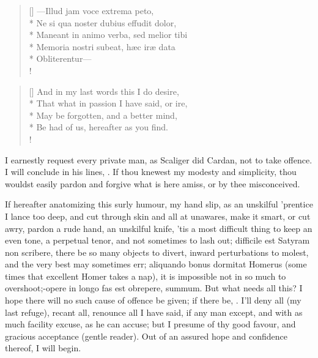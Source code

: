 {\settowidth{\versewidth}{Maneant in animo verba, sed melior tibi}
\begin{verse}[\versewidth]
---Illud jam voce extrema peto,\\*
Ne si qua noster dubius effudit dolor,\\*
Maneant in animo verba, sed melior tibi\\*
Memoria nostri subeat, h\ae{}c ir\ae{} data\\*
Obliterentur---\\!
\end{verse}

\settowidth{\versewidth}{That what in passion I have said, or ire,}
\begin{verse}[\versewidth]
And in my last words this I do desire,\\*
That what in passion I have said, or ire,\\*
May be forgotten, and a better mind,\\*
Be had of us, hereafter as you find.\\!
\end{verse}

I earnestly request every private man, as Scaliger did Cardan, not to
take offence. I will conclude in his lines, . If thou knewest my modesty and simplicity, thou wouldst
easily pardon and forgive what is here amiss, or by thee misconceived.

If hereafter anatomizing this surly humour, my hand slip, as an
unskilful 'prentice I lance too deep, and cut through skin and all at
unawares, make it smart, or cut awry, pardon a rude hand, an
unskilful knife, 'tis a most difficult thing to keep an even tone, a
perpetual tenor, and not sometimes to lash out; difficile est Satyram
non scribere, there be so many objects to divert, inward perturbations
to molest, and the very best may sometimes err; aliquando bonus
dormitat Homerus (some times that excellent Homer takes a nap), it is
impossible not in so much to overshoot;-opere in longo fas est
obrepere, summum. But what needs all this? I hope there will no such
cause of offence be given; if there be, . I'll deny all (my last refuge), recant all,
renounce all I have said, if any man except, and with as much facility
excuse, as he can accuse; but I presume of thy good favour, and
gracious acceptance (gentle reader). Out of an assured hope and
confidence thereof, I will begin.

}
